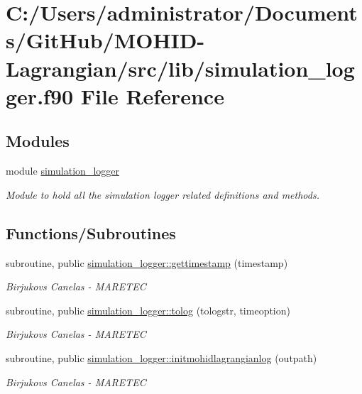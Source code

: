 \hypertarget{simulation__logger_8f90}{}\section{C\+:/\+Users/administrator/\+Documents/\+Git\+Hub/\+M\+O\+H\+I\+D-\/\+Lagrangian/src/lib/simulation\+\_\+logger.f90 File Reference}
\label{simulation__logger_8f90}
\subsection*{Modules}
\begin{DoxyCompactItemize}
\item 
module \hyperlink{namespacesimulation__logger}{simulation\+\_\+logger}
\begin{DoxyCompactList}\small\item\em Module to hold all the simulation logger related definitions and methods. \end{DoxyCompactList}\end{DoxyCompactItemize}
\subsection*{Functions/\+Subroutines}
\begin{DoxyCompactItemize}
\item 
subroutine, public \hyperlink{namespacesimulation__logger_a13446c36aac51547a72b39003f735257}{simulation\+\_\+logger\+::gettimestamp} (timestamp)
\begin{DoxyCompactList}\small\item\em Birjukovs Canelas -\/ M\+A\+R\+E\+T\+EC \end{DoxyCompactList}\item 
subroutine, public \hyperlink{namespacesimulation__logger_a3aaa69ec168b6f34d703fb4033a22d92}{simulation\+\_\+logger\+::tolog} (tologstr, timeoption)
\begin{DoxyCompactList}\small\item\em Birjukovs Canelas -\/ M\+A\+R\+E\+T\+EC \end{DoxyCompactList}\item 
subroutine, public \hyperlink{namespacesimulation__logger_a9c7922c1d3cd57c8322f047799fc6053}{simulation\+\_\+logger\+::initmohidlagrangianlog} (outpath)
\begin{DoxyCompactList}\small\item\em Birjukovs Canelas -\/ M\+A\+R\+E\+T\+EC \end{DoxyCompactList}\end{DoxyCompactItemize}
